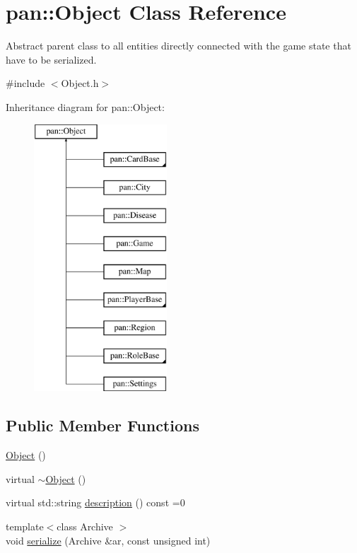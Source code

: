 \hypertarget{classpan_1_1_object}{}\section{pan\+:\+:Object Class Reference}
\label{classpan_1_1_object}


Abstract parent class to all entities directly connected with the game state that have to be serialized.  




{\ttfamily \#include $<$Object.\+h$>$}

Inheritance diagram for pan\+:\+:Object\+:\begin{figure}[H]
\begin{center}
\leavevmode
\includegraphics[height=10.000000cm]{classpan_1_1_object}
\end{center}
\end{figure}
\subsection*{Public Member Functions}
\begin{DoxyCompactItemize}
\item 
\hyperlink{classpan_1_1_object_a2ee7680fdf1f046d5f6f4a8bd5529725}{Object} ()
\item 
virtual \hyperlink{classpan_1_1_object_a88ddecef476f026deda410f3b95fe9ca}{$\sim$\+Object} ()
\item 
virtual std\+::string \hyperlink{classpan_1_1_object_a2bb6d3117bb32f5774657c83f118ed8b}{description} () const =0
\item 
{\footnotesize template$<$class Archive $>$ }\\void \hyperlink{classpan_1_1_object_aa69aa8f0aaf6b5b1cd8cd574a00b5b56}{serialize} (Archive \&ar, const unsigned int)
\end{DoxyCompactItemize}
